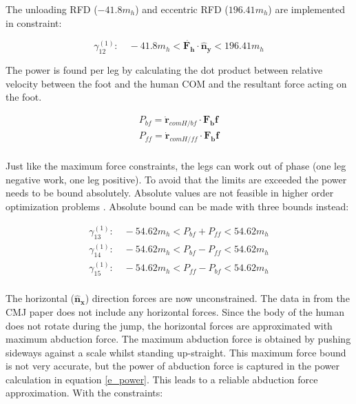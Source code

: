 \documentclass[default,iicol]{sn-jnl}
\theoremstyle{thmstyleone}%
\theoremstyle{thmstyletwo}%
\theoremstyle{thmstylethree}%
\begin{document}
The unloading RFD ($-41.8 m_h$) and eccentric RFD ($196.41 m_h$) are implemented in constraint:

\begin{equation}
    \gamma_{12}^{(1)}: \quad  -41.8 m_h < \dot{\mathbf{F_h}} \cdot \mathbf{\hat n_y} < 196.41 m_h  
\end{equation}

The power is found per leg by calculating the dot product between relative velocity between the foot and the human COM and the resultant force acting on the foot. 

\begin{equation}\label{e_power}
    \begin{array}{c}
         P_{bf} = \mathbf{\dot r}_{comH/bf} \cdot \mathbf{F_bf}  \\
         P_{ff} = \mathbf{\dot r}_{comH/ff} \cdot \mathbf{F_bf}  \\
    \end{array}
\end{equation}

Just like the maximum force constraints, the legs can work out of phase (one leg negative work, one leg positive). To avoid that the limits are exceeded the power needs to be bound absolutely. Absolute values are not feasible in higher order optimization problems \cite{kelly_introduction_2017}. Absolute bound can be made with three bounds instead:

\begin{equation}
    \begin{array}{c}
         \gamma_{13}^{(1)}:\quad  -54.62 m_h < P_{bf} + P_{ff} < 54.62 m_h  \\
         \gamma_{14}^{(1)}:\quad  -54.62 m_h < P_{bf} - P_{ff} < 54.62 m_h  \\
         \gamma_{15}^{(1)}:\quad  -54.62 m_h < P_{ff} - P_{bf} < 54.62 m_h  \\
    \end{array}
\end{equation}

The horizontal ($\mathbf{\hat n_x}$) direction forces are now unconstrained. The data in from the CMJ paper does not include any horizontal forces. Since the body of the human does not rotate during the jump, the horizontal forces are approximated with maximum abduction force. The maximum abduction force is obtained by pushing sideways against a scale whilst standing up-straight. This maximum force bound is not very accurate, but the power of abduction force is captured in the power calculation in equation \ref{e_power}. This leads to a reliable abduction force approximation. With the constraints:
\end{document}
